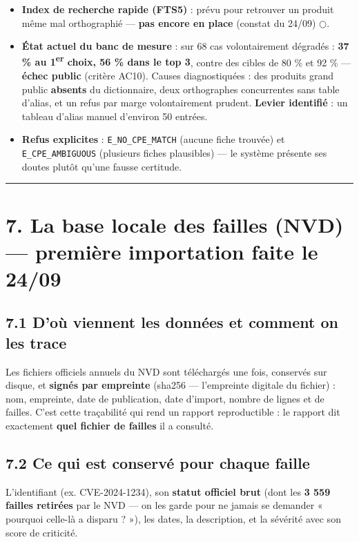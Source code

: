 \documentclass[11pt,a4paper]{article}
\newcommand{\afaire}{\textcolor{orange!85!black}{$\bigcirc$}}  %
\begin{document}
\begin{itemize}  \item \textbf{Index de recherche rapide (FTS5)} : prévu pour retrouver un produit même mal orthographié — \textbf{pas encore en place} (constat du 24/09) \afaire.
\end{itemize}

\begin{itemize}  \item \textbf{État actuel du banc de mesure} : sur 68 cas volontairement dégradés : \textbf{37 \% au 1\textsuperscript{er} choix, 56 \% dans le top 3}, contre des cibles de 80 \% et 92 \% — \textbf{échec public} (critère AC10). Causes diagnostiquées : des produits grand public \textbf{absents} du dictionnaire, deux orthographes concurrentes sans table d'alias, et un refus par marge volontairement prudent. \textbf{Levier identifié} : un tableau d'alias manuel d'environ 50 entrées.
\end{itemize}

\begin{itemize}  \item \textbf{Refus explicites} : \texttt{E\_\allowbreak{}NO\_\allowbreak{}CPE\_\allowbreak{}MATCH} (aucune fiche trouvée) et \texttt{E\_\allowbreak{}CPE\_\allowbreak{}AMBIGUOUS} (plusieurs fiches plausibles) — le système présente ses doutes plutôt qu'une fausse certitude.
\end{itemize}

\medskip\hrule\medskip
\section*{7. La base locale des failles (NVD) — première importation faite le 24/09}
\subsection*{7.1 D'où viennent les données et comment on les trace}
Les fichiers officiels annuels du NVD sont téléchargés une fois, conservés sur disque, et \textbf{signés par empreinte} (sha256 — l'empreinte digitale du fichier) : nom, empreinte, date de publication, date d'import, nombre de lignes et de failles. C'est cette traçabilité qui rend un rapport reproductible : le rapport dit exactement \textbf{quel fichier de failles} il a consulté.

\subsection*{7.2 Ce qui est conservé pour chaque faille}
L'identifiant (ex. CVE-2024-1234), son \textbf{statut officiel brut} (dont les \textbf{3 559 failles retirées} par le NVD — on les garde pour ne jamais se demander « pourquoi celle-là a disparu ? »), les dates, la description, et la sévérité avec son score de criticité.
\end{document}
